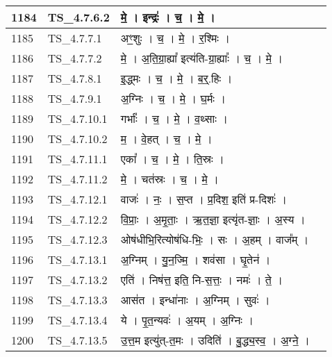 \documentclass[17pt]{extarticle}
\begin{document}
\begin{longtable}{||p{0.4in}||p{0.9in}||p{4.0in}||p{0.9in}||}
        \hline
            1184 & TS\_4.7.6.2 & मे॒   ।   इन्द्रः॑   ।   च॒   ।   मे॒   ।    &      \\
        \hline
            1185 & TS\_4.7.7.1 & अꣳ॒॒शुः   ।   च॒   ।   मे॒   ।   र॒श्मिः   ।    &      \\
        \hline
            1186 & TS\_4.7.7.2 & मे॒   ।   अ॒ति॒ग्रा॒ह्या᳚ इत्य॑ति{-}ग्रा॒ह्याः᳚   ।   च॒   ।   मे॒   ।    &      \\
        \hline
            1187 & TS\_4.7.8.1 & इ॒द्ध्मः   ।   च॒   ।   मे॒   ।   ब॒र्॒.हिः   ।    &      \\
        \hline
            1188 & TS\_4.7.9.1 & अ॒ग्निः   ।   च॒   ।   मे॒   ।   घ॒र्मः   ।    &      \\
        \hline
            1189 & TS\_4.7.10.1 & गर्भाः᳚   ।   च॒   ।   मे॒   ।   व॒थ्साः   ।    &      \\
        \hline
            1190 & TS\_4.7.10.2 & म॒   ।   वे॒हत्   ।   च॒   ।   मे॒   ।    &      \\
        \hline
            1191 & TS\_4.7.11.1 & एका᳚   ।   च॒   ।   मे॒   ।   ति॒स्रः   ।    &      \\
        \hline
            1192 & TS\_4.7.11.2 & मे॒   ।   चत॑स्रः   ।   च॒   ।   मे॒   ।    &      \\
        \hline
            1193 & TS\_4.7.12.1 & वाजः॑   ।   नः॒   ।   स॒प्त   ।   प्र॒दिश॒ इति॑ प्र{-}दिशः॑   ।    &      \\
        \hline
            1194 & TS\_4.7.12.2 & वि॒प्राः॒   ।   अ॒मृ॒ताः॒   ।   ऋ॒त॒ज्ञा॒ इत्यृ॑त{-}ज्ञाः॒   ।   अ॒स्य   ।    &      \\
        \hline
            1195 & TS\_4.7.12.3 & ओष॑धीभि॒रित्योष॑धि{-}भिः॒   ।   सः   ।   अ॒हम्   ।   वाज᳚म्   ।    &      \\
        \hline
            1196 & TS\_4.7.13.1 & अ॒ग्निम्   ।   यु॒न॒ज्मि॒   ।   शव॑सा   ।   घृ॒तेन॑   ।    &      \\
        \hline
            1197 & TS\_4.7.13.2 & एति॑   ।   निष॑त्त॒ इति॒ नि{-}स॒त्तः॒   ।   नमः॑   ।   ते॒   ।    &      \\
        \hline
            1198 & TS\_4.7.13.3 & आस॑त   ।   इन्धा॑नाः   ।   अ॒ग्निम्   ।   सुवः॑   ।    &      \\
        \hline
            1199 & TS\_4.7.13.4 & ये   ।   पृ॒त॒न्यवः॑   ।   अ॒यम्   ।   अ॒ग्निः   ।    &      \\
        \hline
            1200 & TS\_4.7.13.5 & उ॒त्त॒म इत्यु॑त्{-}त॒मः   ।   उदिति॑   ।   बु॒द्ध्य॒स्व॒   ।   अ॒ग्ने॒   ।    &      \\

\end{longtable}
\end{document}
